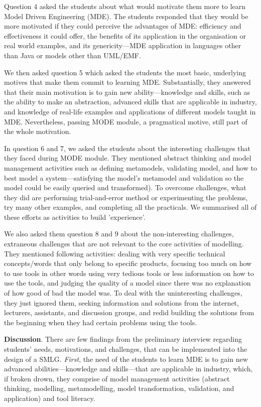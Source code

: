 \documentclass[12pt, a4paper]{report}
\begin{document}
{Question 4 asked the students about what would motivate them more to learn Model Driven Engineering (MDE). The students responded that they would be more motivated if they could perceive the advantages of MDE: efficiency and effectiveness it could offer, the benefits of its application in the organisation or real world examples, and its genericity---MDE application in languages other than Java or models other than UML/EMF.

We then asked question 5 which asked the students the most basic, underlying motives that make them commit to learning MDE. Substantially, they answered that their main motivation is to gain new ability---knowledge and skills, such as the ability to make an abstraction, advanced skills that are applicable in industry, and knowledge of real-life examples and applications of different models taught in MDE. Nevertheless, passing MODE module, a pragmatical motive, still part of the whole motivation. 

In question 6 and 7, we asked the students about the interesting challenges that they faced during MODE module. They mentioned abstract thinking and model management activities such as defining metamodels, validating model, and how to best model a system---satisfying the model's metamodel and validation so the model could be easily queried and transformed). To overcome challenges, what they did are performing trial-and-error method or experimenting the problems, try many other examples, and completing all the practicals. We summarised all of these efforts as activities to build 'experience'.

We also asked them question 8 and 9 about the non-interesting challenges, extraneous challenges that are not relevant to the core activities of modelling. They mentioned following activities: dealing with very specific technical concepts/words that only belong to specific products, focusing too much on how to use tools in other words using very tedious tools or less information on how to use the tools, and judging the quality of a model since there was no explanation of how good of bad the model was. To deal with the uninteresting challenges, they just ignored them, seeking information and solutions from the internet, lecturers, assistants, and discussion groups, and redid building the solutions from the beginning when they had certain problems using the tools.

\textbf{Discussion}. There are few findings from the preliminary interview regarding students' needs, motivations, and challenges, that can be implemented into the design of a SMLG. \textit{First}, the need of the students to learn MDE is to gain new advanced abilities---knowledge and skills---that are applicable in industry, which, if broken drown, they comprise of model management activities (abstract thinking, modelling, metamodelling, model transformation, validation, and application) and tool literacy. 

}
\end{document}
